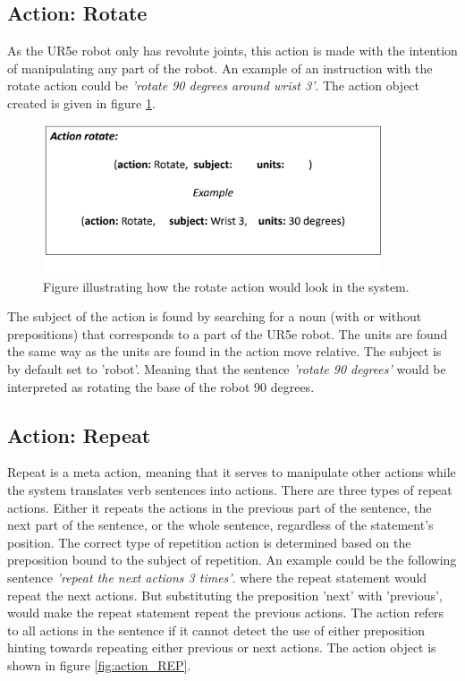 \subsection{Action: Rotate} \label{esc:SA_ROT}
As the UR5e robot only has revolute joints, this action is made with the intention of manipulating any part of the robot. An example of an instruction with the rotate action could be \textit{'\textit{rotate 90 degrees around wrist 3}'}.
The action object created is given in figure \ref{fig:action_ROT}.

\begin{figure}[ht]
    \centering
    \includegraphics[width=10cm]{img/action_ROTATE.png}
    \caption{Figure illustrating how the rotate action would look in the system.}
    \label{fig:action_ROT}
\end{figure}

The subject of the action is found by searching for a noun (with or without prepositions) that corresponds to a part of the UR5e robot. The units are found the same way as the units are found in the action move relative. The subject is by default set to 'robot'. Meaning that the sentence \textit{'rotate 90 degrees'} would be interpreted as rotating the base of the robot 90 degrees.


\subsection{Action: Repeat} \label{esc:SA_REPEAT}
Repeat is a meta action, meaning that it serves to manipulate other actions while the system translates verb sentences into actions.
There are three types of repeat actions. Either it repeats the actions in the previous part of the sentence, the next part of the sentence, or the whole sentence, regardless of the statement's position. The correct type of repetition action is determined based on the preposition bound to the subject of repetition. An example could be the following sentence \textit{'repeat the next actions 3 times'}.
where the repeat statement would repeat the next actions. But substituting the preposition 'next' with 'previous', would make the repeat statement repeat the previous actions. The action refers to all actions in the sentence if it cannot detect the use of either preposition hinting towards repeating either previous or next actions. The action object is shown in figure \ref{fig:action_REP}.

